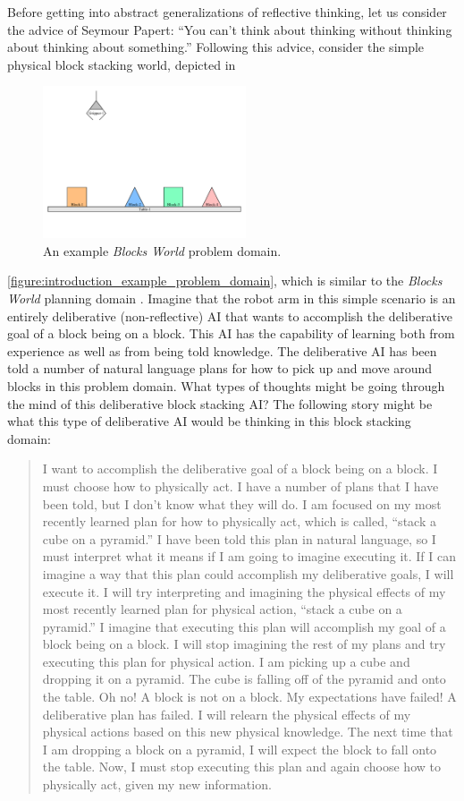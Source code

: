 Before getting into abstract generalizations of reflective thinking,
let us consider the advice of Seymour Papert: ``You can't think about
thinking without thinking about thinking about something.''  Following
this advice, consider the simple physical block stacking world,
depicted in
\begin{figure}
\includegraphics[width=6cm]{gfx/blocks_world_large-01}
  \caption[An example {\emph{Blocks World}} problem domain.]{An
    example {\emph{Blocks World}} problem domain.}
  \label{figure:introduction_example_problem_domain}
\end{figure}
{\autoref{figure:introduction_example_problem_domain}}, which is
similar to the {\emph{Blocks World}} planning domain
{\cite[]{winograd:1970}}.  Imagine that the robot arm in this simple
scenario is an entirely deliberative (non-reflective) AI that wants to
accomplish the deliberative goal of a block being on a block.  This AI
has the capability of learning both from experience as well as from
being told knowledge.  The deliberative AI has been told a number of
natural language plans for how to pick up and move around blocks in
this problem domain.  What types of thoughts might be going through
the mind of this deliberative block stacking AI?  The following story
might be what this type of deliberative AI would be thinking in this
block stacking domain:
\begin{quote}
  I want to accomplish the deliberative goal of a block being on a
  block.  I must choose how to physically act.  I have a number of
  plans that I have been told, but I don't know what they will do.  I
  am focused on my most recently learned plan for how to physically
  act, which is called, ``stack a cube on a pyramid.''  I have been
  told this plan in natural language, so I must interpret what it
  means if I am going to imagine executing it.  If I can imagine a way
  that this plan could accomplish my deliberative goals, I will
  execute it.  I will try interpreting and imagining the physical
  effects of my most recently learned plan for physical action,
  ``stack a cube on a pyramid.''  I imagine that executing this plan
  will accomplish my goal of a block being on a block.  I will stop
  imagining the rest of my plans and try executing this plan for
  physical action.  I am picking up a cube and dropping it on a
  pyramid.  The cube is falling off of the pyramid and onto the table.
  Oh no!  A block is not on a block.  My expectations have failed!  A
  deliberative plan has failed.  I will relearn the physical effects
  of my physical actions based on this new physical knowledge.  The
  next time that I am dropping a block on a pyramid, I will expect the
  block to fall onto the table.  Now, I must stop executing this plan
  and again choose how to physically act, given my new information.
\end{quote}
